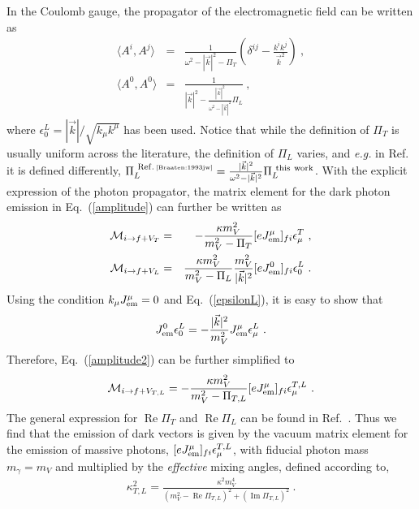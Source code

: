 \documentclass[12pt]{article}
\DeclareMathOperator{\real}{Re}
\DeclareMathOperator{\imag}{Im}
\begin{document}
In the Coulomb gauge, the propagator of the electromagnetic field can be written as
\begin{eqnarray}
\langle A^i, A^j \rangle &=& \frac{1}{\omega^2 - |\vec k|^2 - \Pi_T} \left(\delta^{ij} - \frac{k^i k^j}{\vec k^2}\right) \ , \nonumber \\
\langle A^0, A^0 \rangle &=& \frac{1}{|\vec k|^2 - \frac{|\vec k|^2}{\omega^2 - |\vec k|^2} \Pi_L} \ ,
\end{eqnarray}
where $\epsilon^L_0 = |\vec k|/\sqrt{k_\mu k^\mu}$ has been used.
Notice that while the definition of $\Pi_T$ is usually uniform across
the literature, the definition of $\Pi_L$ varies, and {\em e.g.} in
Ref.~\cite{Braaten:1993jw} it is defined differently, $\Pi_L^{\rm
  ~Ref.\, {\tiny \cite{Braaten:1993jw}}} = \frac{|\vec k|^2}{\omega^2 -
  |\vec k|^2}\Pi_L^{\rm ~this~ work} $.  With the explicit expression
of the photon propagator, the matrix element for the dark photon
emission in Eq.~(\ref{amplitude}) can further be written as
\begin{eqnarray}\label{amplitude2}
{\cal M}_{i\rightarrow f+V_T} &=& - \frac{\kappa m_V^2}{m_V^2 - \Pi_T} [e J^\mu_{\rm em}]_{fi} \epsilon^T_\mu \ , \nonumber \\
{\cal M}_{i\rightarrow f+V_L} &=& \frac{\kappa m_V^2}{ m_V^2 - \Pi_L} \frac{m_V^2}{|\vec k|^2} [e J^0_{\rm em}]_{fi} \epsilon^L_0 \ .
\end{eqnarray}   
Using the condition $k_\mu J^\mu_{\rm em} = 0$ and Eq.~(\ref{epsilonL}), it is easy to show that 
\begin{equation}
J^0_{\rm em} \epsilon^L_0 = - \frac{|\vec k|^2}{m_V^2} J_{\rm em}^\mu \epsilon^L_\mu \ .
\end{equation}
Therefore, Eq.~(\ref{amplitude2}) can be further simplified to
\begin{equation}\label{amplitude3}
{\cal M}_{i\rightarrow f+V_{T,L}} = - \frac{\kappa m_V^2}{m_V^2 - \Pi_{T,L}} [e J^\mu_{\rm em}]_{fi} \epsilon^{T,L}_\mu \ .
\end{equation}
%
%
%
%
%
%
The general expression for $\real \Pi_{T}$ and $\real \Pi_{L}$ can be
found in Ref.~\cite{Braaten:1993jw}.  Thus we find that the emission
of dark vectors is given by the vacuum matrix element for the emission
of massive photons, $[e J^\mu_{\rm em}]_{fi} \epsilon^{T,L}_\mu$, with
fiducial photon mass $m_\gamma = m_V$ and multiplied by the {\em
  effective} mixing angles, defined according to,
\begin{eqnarray}\label{eq:kappa}
\kappa_{T,L}^{2} = \frac{\kappa^{2} m_{V}^{4}}{(m_{V}^{2} - \real \Pi_{T,L})^{2} + (\imag \Pi_{T,L})^{2}} \ . 
\end{eqnarray}
\end{document}
